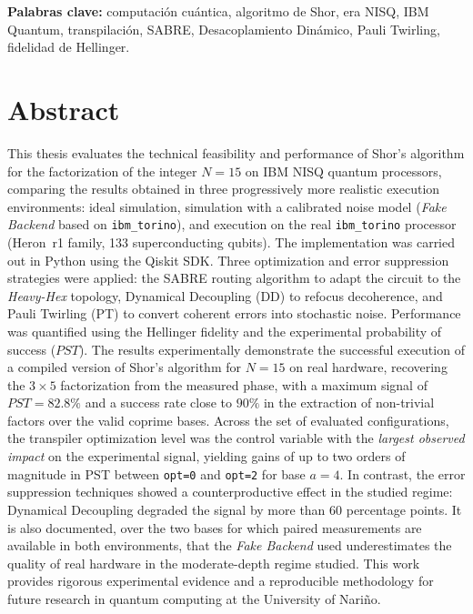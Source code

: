 \documentclass[12pt, spanish]{book}
\begin{document}
\noindent\textbf{Palabras clave:} computación cuántica, algoritmo de Shor, era NISQ, IBM Quantum, transpilación, SABRE, Desacoplamiento Dinámico, Pauli Twirling, fidelidad de Hellinger.

\chapter*{Abstract}

This thesis evaluates the technical feasibility and performance of Shor's algorithm for the factorization of the integer \(N = 15\) on IBM NISQ quantum processors, comparing the results obtained in three progressively more realistic execution environments: ideal simulation, simulation with a calibrated noise model (\textit{Fake Backend} based on \texttt{ibm\_torino}), and execution on the real \texttt{ibm\_torino} processor (Heron~r1 family, 133 superconducting qubits). The implementation was carried out in Python using the Qiskit SDK. Three optimization and error suppression strategies were applied: the SABRE routing algorithm to adapt the circuit to the \textit{Heavy-Hex} topology, Dynamical Decoupling (DD) to refocus decoherence, and Pauli Twirling (PT) to convert coherent errors into stochastic noise. Performance was quantified using the Hellinger fidelity and the experimental probability of success (\(PST\)). The results experimentally demonstrate the successful execution of a compiled version of Shor's algorithm for \(N = 15\) on real hardware, recovering the \(3 \times 5\) factorization from the measured phase, with a maximum signal of \(PST = 82.8\%\) and a success rate close to \(90\%\) in the extraction of non-trivial factors over the valid coprime bases. Across the set of evaluated configurations, the transpiler optimization level was the control variable with the \emph{largest observed impact} on the experimental signal, yielding gains of up to two orders of magnitude in PST between \texttt{opt=0} and \texttt{opt=2} for base $a=4$. In contrast, the error suppression techniques showed a counterproductive effect in the studied regime: Dynamical Decoupling degraded the signal by more than 60 percentage points. It is also documented, over the two bases for which paired measurements are available in both environments, that the \textit{Fake Backend} used underestimates the quality of real hardware in the moderate-depth regime studied. This work provides rigorous experimental evidence and a reproducible methodology for future research in quantum computing at the University of Nariño.\\
\end{document}
